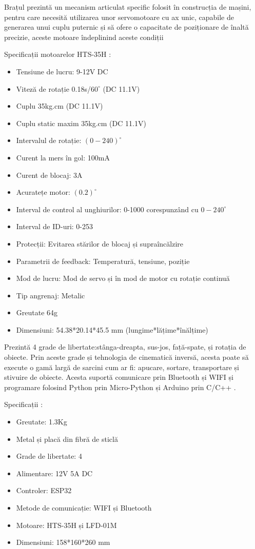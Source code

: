 Brațul prezintă un mecanism articulat specific folosit în construcția de mașini, pentru care necesită utilizarea unor servomotoare cu ax unic, capabile de generarea unui cuplu puternic și să ofere o capacitate de poziționare de înaltă precizie, aceste motoare îndeplinind aceste condiții \cite{MaxArmServo}

Specificații motoarelor HTS-35H \cite{MaxArmServo}:
\begin{itemize}
	\item Tensiune de lucru: 9-12V DC
	\item Viteză de rotație 0.18s/$60^{\circ}$ (DC 11.1V)
	\item Cuplu 35kg.cm (DC 11.1V)
	\item Cuplu static maxim 35kg.cm (DC 11.1V)
	\item Intervalul de rotație: $(0-240)^{\circ}$
	\item Curent la mers în gol: 100mA
	\item Curent de blocaj: 3A
	\item Acuratețe motor:  $(0.2)^{\circ}$
	\item Interval de control al unghiurilor: 0-1000 corespunzând cu $0-240^{\circ}$
	\item Interval de ID-uri: 0-253
	\item Protecții: Evitarea stărilor de blocaj și supraîncălzire
	\item Parametrii de feedback: Temperatură, tensiune, poziție
	\item Mod de lucru: Mod de servo și în mod de motor cu rotație continuă
	\item Tip angrenaj: Metalic
	\item Greutate 64g
	\item Dimensiuni: 54.38*20.14*45.5 mm (lungime*lățime*înălțime)
\end{itemize}


Prezintă 4 grade de libertate:stânga-dreapta, sus-jos, față-spate, și rotația de obiecte. Prin aceste grade și tehnologia de cinematică inversă, acesta poate să execute o gamă largă de sarcini cum ar fi: apucare, sortare, transportare și stivuire de obiecte. Acesta suportă comunicare prin Bluetooth și WIFI și programare folosind Python prin Micro-Python și Arduino prin C/C++ \cite{MaxArm}. 



Specificații \cite{MaxArm}:
\begin{itemize}

	\item Greutate: 1.3Kg
	\item Metal și placă din fibră de sticlă
	\item Grade de libertate: 4
	\item Alimentare: 12V 5A DC
	\item Controler: ESP32
	\item Metode de comunicație: WIFI și Bluetooth
	\item Motoare: HTS-35H și LFD-01M 
	\item Dimensiuni: 158*160*260 mm 
	\end{itemize}
	

